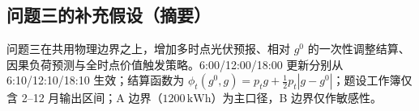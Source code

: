 \subsection{问题三的补充假设（摘要）}
问题三在共用物理边界之上，增加多时点光伏预报、相对 $g^0$ 的一次性调整结算、因果负荷预测与全时点价值触发策略。6:00/12:00/18:00 更新分别从 6:10/12:10/18:10 生效；结算函数为 $\phi_t(g^0,g)=p_tg+\tfrac12 p_t|g-g^0|$；题设工作簿仅含 2--12 月输出区间；A 边界（$1200\,\mathrm{kWh}$）为主口径，B 边界仅作敏感性。
